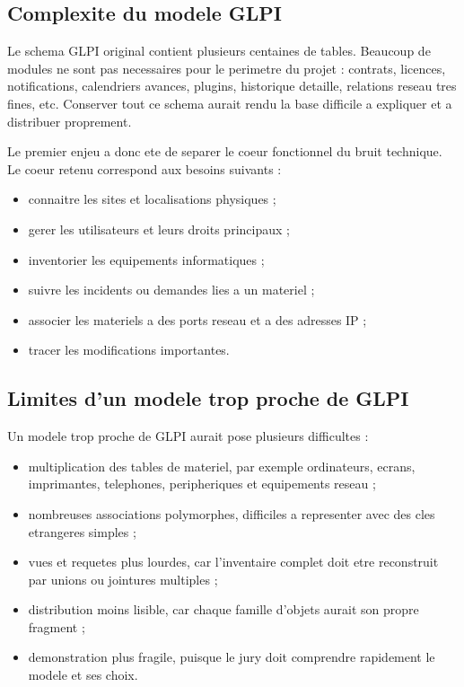 \documentclass[11pt,a4paper]{article}
\begin{document}
\subsection{Complexite du modele GLPI}

Le schema GLPI original contient plusieurs centaines de tables. Beaucoup de
modules ne sont pas necessaires pour le perimetre du projet : contrats,
licences, notifications, calendriers avances, plugins, historique detaille,
relations reseau tres fines, etc. Conserver tout ce schema aurait rendu la base
difficile a expliquer et a distribuer proprement.

Le premier enjeu a donc ete de separer le coeur fonctionnel du bruit technique.
Le coeur retenu correspond aux besoins suivants :

\begin{itemize}
  \item connaitre les sites et localisations physiques ;
  \item gerer les utilisateurs et leurs droits principaux ;
  \item inventorier les equipements informatiques ;
  \item suivre les incidents ou demandes lies a un materiel ;
  \item associer les materiels a des ports reseau et a des adresses IP ;
  \item tracer les modifications importantes.
\end{itemize}

\subsection{Limites d'un modele trop proche de GLPI}

Un modele trop proche de GLPI aurait pose plusieurs difficultes :

\begin{itemize}
  \item multiplication des tables de materiel, par exemple ordinateurs,
  ecrans, imprimantes, telephones, peripheriques et equipements reseau ;
  \item nombreuses associations polymorphes, difficiles a representer avec des
  cles etrangeres simples ;
  \item vues et requetes plus lourdes, car l'inventaire complet doit etre
  reconstruit par unions ou jointures multiples ;
  \item distribution moins lisible, car chaque famille d'objets aurait son
  propre fragment ;
  \item demonstration plus fragile, puisque le jury doit comprendre rapidement
  le modele et ses choix.
\end{itemize}
\end{document}
